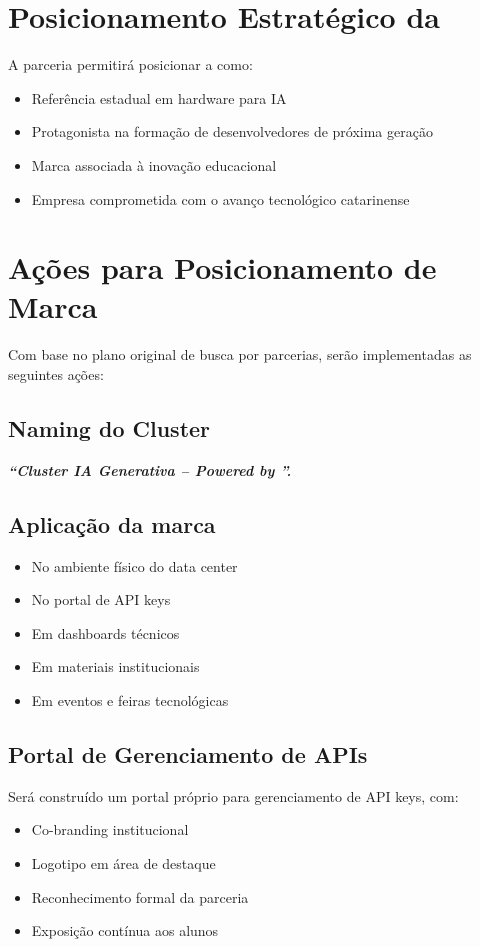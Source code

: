\documentclass[12pt,a4paper,]{abntex2}
\begin{document}
\section{Posicionamento Estratégico da \empresaParceiraAbr}
A parceria permitirá posicionar a \empresaParceiraAbr como:
\begin{itemize}
\item Referência estadual em hardware para IA
\item Protagonista na formação de desenvolvedores de próxima geração
\item Marca associada à inovação educacional
\item Empresa comprometida com o avanço tecnológico catarinense
\end{itemize}

\section{Ações para Posicionamento de Marca}
Com base no plano original de busca por parcerias, serão implementadas as seguintes ações:

\subsection{Naming do Cluster}
\textbf{\textit{“Cluster IA Generativa – Powered by \empresaParceiraAbr ”.}}

\subsection{Aplicação da marca}
\begin{itemize}
\item No ambiente físico do data center
\item No portal de API keys
\item Em dashboards técnicos
\item Em materiais institucionais
\item Em eventos e feiras tecnológicas
\end{itemize}

\subsection{Portal de Gerenciamento de APIs}
Será construído um portal próprio para gerenciamento de API keys, com:
\begin{itemize}
\item Co-branding institucional
\item Logotipo em área de destaque
\item Reconhecimento formal da parceria
\item Exposição contínua aos alunos
\end{itemize}
\end{document}
